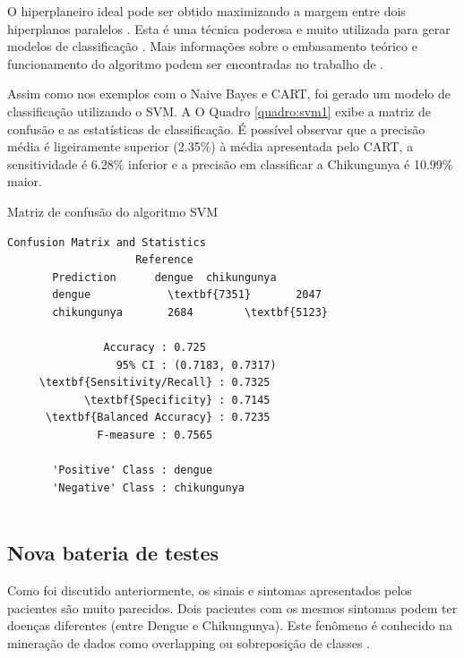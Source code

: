 O hiperplaneiro ideal pode ser obtido maximizando a margem entre dois hiperplanos paralelos \cite{qi2013robust}. Esta é uma técnica  poderosa e muito utilizada para gerar modelos de classificação \cite{Meyer2017}. Mais informações sobre o embasamento teórico e funcionamento do algoritmo podem ser encontradas no trabalho de .

Assim como nos exemplos com o Naive Bayes e CART, foi gerado um modelo de classificação utilizando o SVM. A O Quadro \ref{quadro:svm1} exibe a matriz de confusão e as estatísticas de classificação. É possível observar que a precisão média é ligeiramente superior (2.35\%) à média apresentada pelo CART, a sensitividade é 6.28\% inferior e a precisão em classificar a Chikungunya é 10.99\% maior.

\begin{quadro}
\caption{\label{quadro:svm1}Matriz de confusão do algoritmo SVM}
\begingroup
    \fontsize{10pt}{9pt}\selectfont
    \begin{Verbatim}[commandchars=\\\{\}]
      Confusion Matrix and Statistics
                    Reference
       Prediction      dengue  chikungunya
       dengue            \textbf{7351}       2047
       chikungunya       2684        \textbf{5123}
                                         
               Accuracy : 0.725         
                 95% CI : (0.7183, 0.7317) 
     \textbf{Sensitivity/Recall} : 0.7325         
            \textbf{Specificity} : 0.7145         
      \textbf{Balanced Accuracy} : 0.7235
              F-measure : 0.7565        
         
       'Positive' Class : dengue 
       'Negative' Class : chikungunya
  
    \end{Verbatim}  
\endgroup
{}
\end{quadro}


\subsection{Nova bateria de testes}

Como foi discutido anteriormente, os sinais e sintomas apresentados pelos pacientes são muito parecidos. Dois pacientes com os mesmos sintomas podem ter doenças diferentes (entre Dengue e Chikungunya). Este fenômeno é conhecido na mineração de dados como overlapping ou sobreposição de classes \cite{xiong2010classification}.

